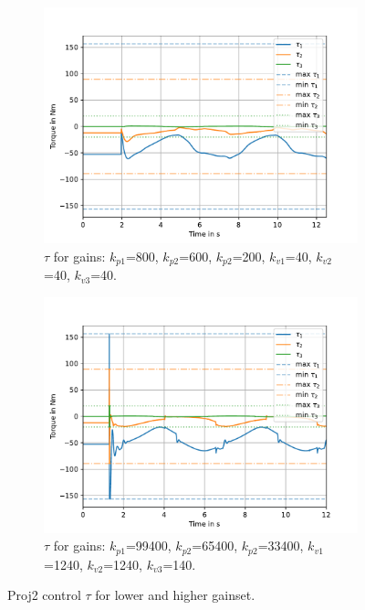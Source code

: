 \begin{figure}[H]
    \centering
    \begin{subfigure}[t]{0.48\textwidth}
        \centering
        \includegraphics[width=\textwidth]{SRC/CircleTraj_small_kp_tau.pdf} %
        \caption{$\tau$ for gains: $k_{p1}$=800, $k_{p2}$=600, $k_{p2}$=200, $k_{v1}$=40, $k_{v2}$=40, $k_{v3}$=40.}
        \label{fig:HighTau}
    \end{subfigure}
    \hfill
    \begin{subfigure}[t]{0.48\textwidth}
        \centering
        \includegraphics[width=\textwidth]{SRC/CircleTraj_large_kp_tau.pdf} %
        \caption{$\tau$ for gains: $k_{p1}$=99400, $k_{p2}$=65400, $k_{p2}$=33400, $k_{v1}$=1240, $k_{v2}$=1240, $k_{v3}$=140.}
        \label{fig:LowTau}
    \end{subfigure}
    \caption{Proj2 control $\tau$ for lower and higher gainset.}
    \label{fig:TauComparison}
\end{figure}










